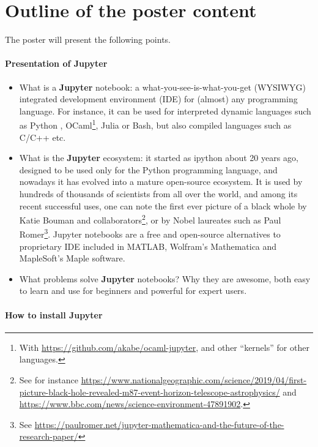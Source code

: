 \documentclass[runningheads]{llncs}
\newcommand{\Jupyter}{\textbf{Jupyter}}
\begin{document}
\section{Outline of the poster content}

The poster will present the following points.


\paragraph{Presentation of \Jupyter}

\begin{itemize}
    \item What is a \Jupyter{} notebook: a what-you-see-is-what-you-get (WYSIWYG) integrated development environment (IDE) for (almost) any programming language. For instance, it can be used for interpreted dynamic languages such as Python \cite{python}, OCaml\footnote{With \url{https://github.com/akabe/ocaml-jupyter}, and other ``kernels'' for other languages.}, Julia or Bash, but also compiled languages such as C/C++ etc.

    \item What is the \Jupyter{} ecosystem: it started as ipython \cite{ipython} about 20 years ago, designed to be used only for the Python programming language, and nowadays it has evolved into a mature open-source ecosystem.
    It is used by hundreds of thousands of scientists from all over the world, and among its recent successful uses, one can note the first ever picture of a black whole by Katie Bouman and collaborators\footnote{See for instance \url{https://www.nationalgeographic.com/science/2019/04/first-picture-black-hole-revealed-m87-event-horizon-telescope-astrophysics/} and \url{https://www.bbc.com/news/science-environment-47891902}.}, or by Nobel laureates such as Paul Romer\footnote{See \url{https://paulromer.net/jupyter-mathematica-and-the-future-of-the-research-paper/}}.
    Jupyter notebooks are a free and open-source alternatives to proprietary IDE included in MATLAB, Wolfram's Mathematica and MapleSoft's Maple software.

    \item What problems solve \Jupyter{} notebooks? Why they are awesome, both easy to learn and use for beginners and powerful for expert users.
\end{itemize}

\paragraph{How to install \Jupyter}
\end{document}
